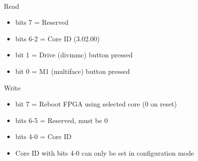 \\
Read
\begin{itemize}
\item bits 7 = Reserved
\item bits 6-2 = Core ID (3.02.00)
\item bit 1 = Drive (divmmc) button pressed
\item bit 0 = M1 (multiface) button pressed
\end{itemize}
Write
\begin{itemize}
\item bit 7 = Reboot FPGA using selected core (0 on reset)
\item bits 6-5 = Reserved, must be 0
\item bits 4-0 = Core ID
\item[] Core ID with bits 4-0 can only be set in configuration mode
\end{itemize}

